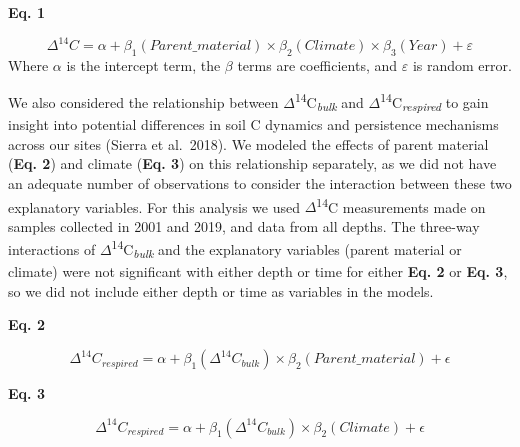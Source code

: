 \documentclass[english,man,floatsintext]{apa6}
\begin{document}
\textbf{Eq. 1}

\[\Delta^{14}C = \alpha + \beta_{1}(Parent\_material) \times \beta_{2}(Climate) \times \beta_{3}(Year) + \varepsilon\]
Where \(\alpha\) is the intercept term, the \(\beta\) terms are coefficients, and \(\varepsilon\) is random error.

We also considered the relationship between \(\Delta\)\textsuperscript{14}C\textsubscript{\emph{bulk}} and \(\Delta\)\textsuperscript{14}C\textsubscript{\emph{respired}} to gain insight into potential differences in soil C dynamics and persistence mechanisms across our sites (Sierra et al.~2018). We modeled the effects of parent material (\textbf{Eq. 2}) and climate (\textbf{Eq. 3}) on this relationship separately, as we did not have an adequate number of observations to consider the interaction between these two explanatory variables. For this analysis we used \(\Delta\)\textsuperscript{14}C measurements made on samples collected in 2001 and 2019, and data from all depths. The three-way interactions of \(\Delta\)\textsuperscript{14}C\textsubscript{\emph{bulk}} and the explanatory variables (parent material or climate) were not significant with either depth or time for either \textbf{Eq. 2} or \textbf{Eq. 3}, so we did not include either depth or time as variables in the models.

\textbf{Eq. 2}

\[\Delta^{14}C_{respired} = \alpha + \beta_{1}(\Delta^{14}C_{bulk}) \times \beta_{2}(Parent\_material) + \epsilon\]

\textbf{Eq. 3}

\[\Delta^{14}C_{respired} = \alpha + \beta_{1}(\Delta^{14}C_{bulk}) \times \beta_{2}(Climate) + \epsilon\]
\end{document}
